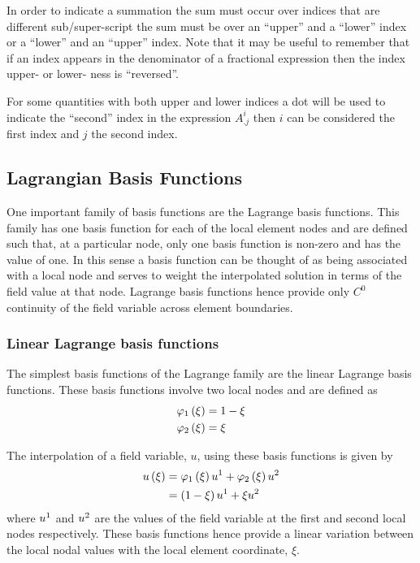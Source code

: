 In order to indicate a summation the sum must occur over indices that are
different sub/super-script \ie the sum must be over an ``upper'' and a
``lower'' index or a ``lower'' and an ``upper'' index. Note that it may be
useful to remember that if an index appears in the denominator of a fractional
expression then the index upper- or lower- ness is ``reversed''. 

For some quantities with both upper and lower indices a dot will be used to
indicate the ``second'' index \eg in the expression $A^{i}_{.j}$ then $i$ can
be considered the first index and $j$ the second index.

\subsection{Lagrangian Basis Functions}
\label{sec:lagrangebasisfunctions}

One important family of basis functions are the Lagrange basis functions. This
family has one basis function for each of the local element nodes and are
defined such that, at a particular node, only one basis function is non-zero
and has the value of one. In this sense a basis function can be thought of as
being associated with a local node and serves to weight the interpolated
solution in terms of the field value at that node. Lagrange basis functions
hence provide only $C^{0}$ continuity of the field variable across element
boundaries.

\subsubsection{Linear Lagrange basis functions}

The simplest basis functions of the Lagrange family are the \onedal linear
Lagrange basis functions. These basis functions involve two local nodes and
are defined as
\begin{equation}
  \begin{split}
       \varphi_{1} \left( \xi \right)  &=1-\xi \\
       \varphi_{2} \left( \xi \right)  &=\xi
  \end{split}
  \label{eqn:linearlbfuns}
\end{equation}

The interpolation of a field variable, $u$, using these basis functions is
given by
\begin{equation}
  \begin{split}
     u\left( \xi \right) &=   \varphi_{1} \left( \xi \right)   {u}^{1} +   \varphi_{2} \left( \xi \right)   {u}^{2}  \\
    &=\left( 1-\xi \right) {u}^{1} +\xi {u}^{2} 
  \end{split}
\end{equation}
where $ {u}^{1} $ and $ {u}^{2} $ are the values of the field variable at
the first and second local nodes respectively. These basis functions hence
provide a linear variation between the local nodal values with the local
element coordinate, $\xi$.

